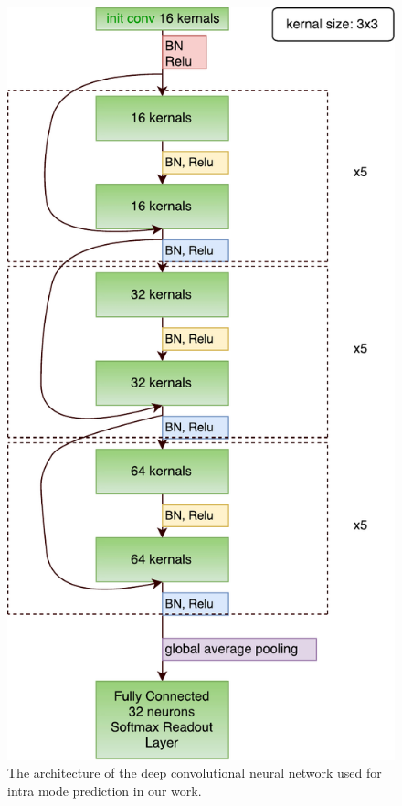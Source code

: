 \begin{figure}
    \centering
    \includegraphics[width=\textwidth,height=\textheight,keepaspectratio]{Figures/our-neural-net-structure.pdf}
    \caption[The architecture of the deep convolutional neural 
    network used for intra mode prediction in our work]{
        The architecture of the deep convolutional neural 
        network used for intra mode prediction in our work.
        }\label{fig:our-architecture}
\end{figure}

